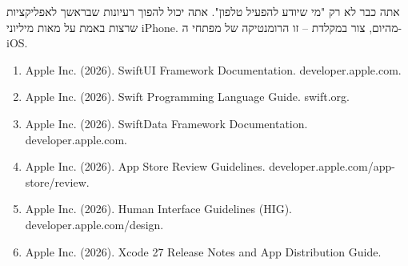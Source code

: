אתה כבר לא רק "מי שיודע להפעיל טלפון". אתה יכול להפוך רעיונות שבראשך לאפליקציות שרצות באמת על מאות מיליוני iPhone. מהיום, צור במקלדת – זו הרומנטיקה של מפתחי ה-iOS.


\begin{enumerate}
  \item Apple Inc. (2026). SwiftUI Framework Documentation. developer.apple.com.
  \item Apple Inc. (2026). Swift Programming Language Guide. swift.org.
  \item Apple Inc. (2026). SwiftData Framework Documentation. developer.apple.com.
  \item Apple Inc. (2026). App Store Review Guidelines. developer.apple.com/app-store/review.
  \item Apple Inc. (2026). Human Interface Guidelines (HIG). developer.apple.com/design.
  \item Apple Inc. (2026). Xcode 27 Release Notes and App Distribution Guide.
\end{enumerate}

